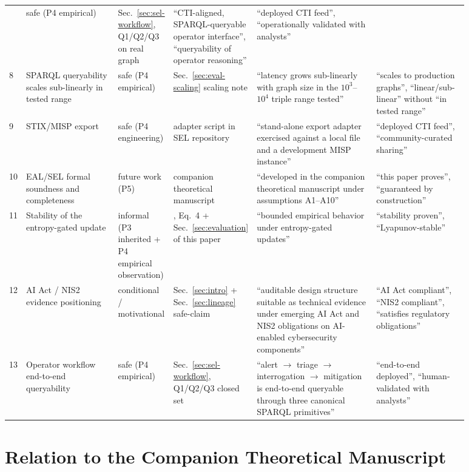 \documentclass[runningheads]{llncs}
\begin{document}
\begin{table}[t]
\begin{tabular}{@{}p{0.015\linewidth}p{0.20\linewidth}p{0.08\linewidth}p{0.13\linewidth}p{0.26\linewidth}p{0.20\linewidth}@{}}
  & safe (P4 empirical)
  & Sec.~\ref{sec:sel-workflow}, Q1/Q2/Q3 on real graph
  & ``CTI-aligned, SPARQL-queryable operator interface'',
    ``queryability of operator reasoning''
  & ``deployed CTI feed'', ``operationally validated with analysts'' \\
8 & SPARQL queryability scales sub-linearly in tested range
  & safe (P4 empirical) & Sec.~\ref{sec:eval-scaling} scaling note
  & ``latency grows sub-linearly with graph size in the
    $10^{3}$--$10^{4}$ triple range tested''
  & ``scales to production graphs'',
    ``linear/sub-linear'' without ``in tested range'' \\
9 & STIX/MISP export
  & safe (P4 engineering) & adapter script in SEL repository
  & ``stand-alone export adapter exercised against a local file and a
    development MISP instance''
  & ``deployed CTI feed'', ``community-curated sharing'' \\
10 & EAL/SEL formal soundness and completeness
  & future work (P5) & companion theoretical manuscript~\cite{paper5}
  & ``developed in the companion theoretical manuscript under
    assumptions A1--A10''
  & ``this paper proves'', ``guaranteed by construction'' \\
11 & Stability of the entropy-gated update
  & informal (P3 inherited + P4 empirical observation)
  & \cite{paper3}, Eq.~4 + Sec.~\ref{sec:evaluation} of this paper
  & ``bounded empirical behavior under entropy-gated updates''
  & ``stability proven'', ``Lyapunov-stable'' \\
12 & AI Act / NIS2 evidence positioning
  & conditional / motivational
  & Sec.~\ref{sec:intro} + Sec.~\ref{sec:lineage} safe-claim
  & ``auditable design structure suitable as technical evidence under
    emerging AI Act and NIS2 obligations on AI-enabled cybersecurity
    components''
  & ``AI Act compliant'', ``NIS2 compliant'',
    ``satisfies regulatory obligations'' \\
13 & Operator workflow end-to-end queryability
  & safe (P4 empirical)
  & Sec.~\ref{sec:sel-workflow}, Q1/Q2/Q3 closed set
  & ``alert $\to$ triage $\to$ interrogation $\to$ mitigation is
    end-to-end queryable through three canonical SPARQL primitives''
  & ``end-to-end deployed'', ``human-validated with analysts'' \\
\bottomrule
\end{tabular}
\end{table}

\section{Relation to the Companion Theoretical Manuscript}
\label{sec:theory}
\end{document}
